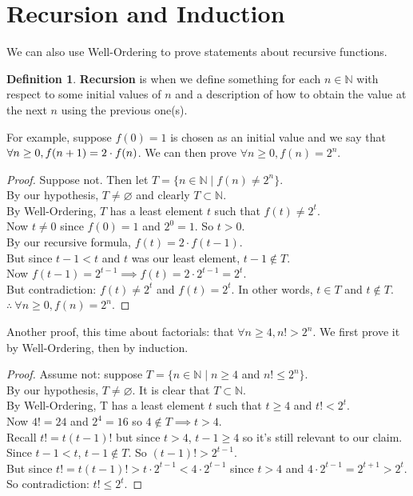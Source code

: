 \documentclass[11pt]{amsart}
\theoremstyle{definition}
\newtheorem{definition}[theorem]{Definition}
\newcommand{\naturals}{\mathbb{N}}
\let\emptyset\varnothing
\begin{document}
\newpage
\section{Recursion and Induction}
We can also use Well-Ordering to prove statements about recursive functions. 
\begin{definition}
	\textbf{Recursion} is when we define something for each $n \in \naturals$ with respect to some initial values of $n$ and a description of how 
	to obtain the value at the next $n$ using the previous one(s).
\end{definition}
For example, suppose $f(0) = 1$ is chosen as an initial value and we say that $\forall n \geq 0, \newline f(n+1) = 2 \cdot f(n)$. We can then prove
$\forall n \geq 0, f(n) = 2^n$.
\begin{proof}
	Suppose not. Then let $T = \{ n \in \naturals \mid f(n) \neq 2^n \}$. \\
	By our hypothesis, $T \neq \emptyset$ and clearly $T \subset \naturals$. \\
	By Well-Ordering, $T$ has a least element $t$ such that $f(t) \neq 2^t$. \\
	Now $t \neq 0$ since $f(0) = 1$ and $2^0 = 1$. So $t > 0$. \\
	By our recursive formula, $f(t) = 2 \cdot f(t - 1)$. \\
	But since $t - 1 < t$ and $t$ was our least element, $t - 1 \notin T$. \\
	Now $f(t - 1) = 2^{t - 1} \implies f(t) = 2 \cdot 2^{t - 1} = 2^t$. \\
	But contradiction: $f(t) \neq 2^t$ and $f(t) = 2^t$. In other words, $t \in T$ and $t \notin T$. \\
	$\therefore \: \forall n \geq 0, f(n) = 2^n$.
\end{proof}
Another proof, this time about factorials: that $\forall n \geq 4, n! > 2^n$. We first prove it by Well-Ordering, then by induction.
\begin{proof}
	Assume not: suppose $T = \{ n \in \naturals \mid n \geq 4$ and $n! \leq 2^n \}$. \\
	By our hypothesis, $T \neq \emptyset$. It is clear that $T \subset \naturals$. \\
	By Well-Ordering, T has a least element $t$ such that $t \geq 4$ and $t! < 2^t$. \\
	Now $4! = 24$ and $2^4 = 16$ so $4 \notin T \implies t > 4$. \\
	Recall $t! = t(t - 1)!$ but since $t > 4$, $t - 1 \geq 4$ so it's still relevant to our claim. \\
	Since $t - 1 < t$, $t - 1 \notin T$. So $(t - 1)! > 2^{t - 1}$. \\
	But since $t! = t(t - 1)! > t \cdot 2^{t - 1} < 4 \cdot 2^{t - 1}$ since $t > 4$ and $4 \cdot 2^{t - 1} = 2^{t + 1} > 2^t$. \\
	So contradiction: $t! \leq 2^t$.
\end{proof}
\end{document}
